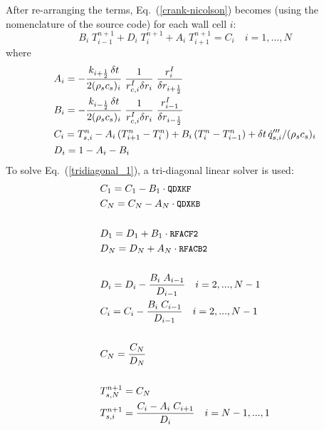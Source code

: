 After re-arranging the terms, Eq.~(\ref{crank-nicolson}) becomes (using the nomenclature of the source code) for each wall cell $i$:
 \begin{equation}
\label{tridiagonal_1}
  B_i \; T_{i-1}^{n+1} + D_i \; T_{i}^{n+1} + A_i \; T_{i+1}^{n+1} = C_i \quad i=1,...,N
\end{equation}
where
\begin{equation}
\label{tridiagonal_2}
\begin{split}
& A_i = -\frac{k_{i+\frac{1}{2}} \, \delta t}{2(\rho_s c_s)_i} \; \frac{1}{r_{c,i}^I \delta r_i} \; \frac{r_{i}^I}{\delta r_{i+\frac{1}{2}}}  \\
& B_i = -\frac{k_{i-\frac{1}{2}} \, \delta t}{2(\rho_s c_s)_i} \; \frac{1}{r_{c,i}^I \delta r_i} \; \frac{r_{i-1}^I}{\delta r_{i-\frac{1}{2}}}   \\
& C_i = T_{s,i}^{n}-A_i \, (T_{i+1}^n-T_i^n) + B_i \, (T_{i}^n-T_{i-1}^n) + \delta t \, \dot{q}_{s,i}'''/(\rho_s c_s)_i \\
& D_i = 1-A_i-B_i
\end{split}
\end{equation}
To solve Eq.~(\ref{tridiagonal_1}), a tri-diagonal linear solver is used:
\begin{equation}
\begin{split}
& C_1 = C_1 - B_1 \cdot \texttt{\small QDXKF} \\
& C_N = C_N - A_N \cdot \texttt{\small QDXKB} \\
& \\
& D_1 = D_1 + B_1 \cdot \texttt{\small RFACF2} \\
& D_N = D_N + A_N \cdot \texttt{\small RFACB2} \\
& \\
& D_i = D_i - \frac{B_i \; A_{i-1}}{D_{i-1}} \quad i = 2, ..., N-1 \\
& C_i = C_i - \frac{B_i \; C_{i-1}}{D_{i-1}} \quad i = 2, ..., N-1\\
& \\
& C_N = \frac{C_N}{D_N} \\
& \\
& T^{n+1}_{s,N} = C_N \\
& T^{n+1}_{s,i} = \frac{C_i - A_i \; C_{i+1}}{D_i} \quad i = N-1,..., 1
\end{split}
\end{equation}
